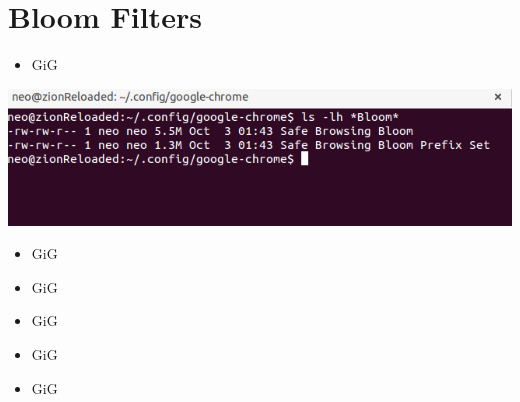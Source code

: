 \documentclass{beamer}
\begin{document}
\section{Bloom Filters}
\begin{frame}{}
    \begin{itemize}
        \item GiG
    \end{itemize}
\end{frame}

\begin{frame}{}
    \begin{center}
        \includegraphics[scale=0.5]{bloomFilterGoogleChrome.png}
    \end{center}
\end{frame}

\begin{frame}{}
    \begin{itemize}
        \item GiG
    \end{itemize}
\end{frame}

\begin{frame}{}
    \begin{itemize}
        \item GiG
    \end{itemize}
\end{frame}

\begin{frame}{}
    \begin{itemize}
        \item GiG
    \end{itemize}
\end{frame}

\begin{frame}{}
    \begin{itemize}
        \item GiG
    \end{itemize}
\end{frame}

\begin{frame}{}
    \begin{itemize}
        \item GiG
    \end{itemize}
\end{frame}
\end{document}
